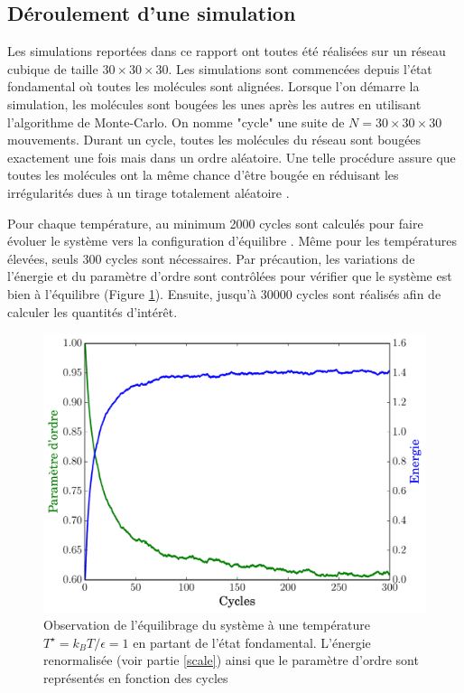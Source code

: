 \documentclass[11pt,a4paper]{article}
\numberwithin{equation}{section}
\begin{document}
\subsection{Déroulement d'une simulation} 
Les simulations reportées dans ce rapport ont toutes été réalisées sur un réseau cubique de taille $30\times 30\times 30$. Les simulations sont commencées depuis l'état fondamental où toutes les molécules sont alignées. Lorsque l'on démarre la simulation, les molécules sont bougées les unes après les autres en utilisant l'algorithme de Monte-Carlo. On nomme "cycle" une suite de $N = 30\times 30\times 30$ mouvements. Durant un cycle, toutes les molécules du réseau sont bougées exactement une fois mais dans un ordre aléatoire. Une telle procédure assure que toutes les molécules ont la même chance d'être bougée en réduisant les irrégularités dues à un tirage totalement aléatoire \cite{fabbri}. 
\medskip

Pour chaque température, au minimum 2000 cycles sont calculés pour faire évoluer le système vers la configuration d'équilibre . Même pour les températures élevées, seuls 300 cycles sont nécessaires. Par précaution, les variations de l'énergie et du paramètre d'ordre sont contrôlées pour vérifier que le système est bien à l'équilibre (Figure \ref{equilibrage}). Ensuite, jusqu'à 30000 cycles sont réalisés afin de calculer les quantités d'intérêt.

\begin{figure}[h!]
    \centering	    
	\includegraphics[scale=0.6]{figures/equilibrage.pdf}
    \caption{Observation de l'équilibrage du système à une température $T^\star = k_B T/\epsilon = 1$ en partant de l'état fondamental. L'énergie renormalisée (voir partie \ref{scale}) ainsi que le paramètre d'ordre sont représentés en fonction des cycles}
    	\label{equilibrage} 
\end{figure}
\end{document}
